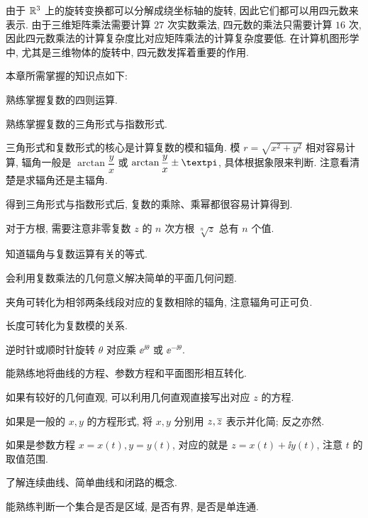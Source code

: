 由于 ${\mathbb{R}}^3$ 上的旋转变换都可以分解成绕坐标轴的旋转, 因此它们都可以用四元数来表示.
由于三维矩阵乘法需要计算 $27$ 次实数乘法, 四元数的乘法只需要计算 $16$ 次, 因此四元数乘法的计算复杂度比对应矩阵乘法的计算复杂度要低.
在计算机图形学中, 尤其是三维物体的旋转中, 四元数发挥着重要的作用.


\startwidepage
{}

本章所需掌握的知识点如下:
\begin{conclusion}
  \item 熟练掌握复数的四则运算.
  \item 熟练掌握复数的三角形式与指数形式.
  \begin{conclusion}
    \item 三角形式和复数形式的核心是计算复数的模和辐角.
    模 $r=\sqrt{x^2+y^2}$ 相对容易计算, 辐角一般是 $\arctan \dfrac yx$ 或 $\arctan \dfrac yx\pm\cpi$, 具体根据象限来判断.
    注意看清楚是求辐角还是主辐角.
    \item 得到三角形式与指数形式后, 复数的乘除、乘幂都很容易计算得到.
    \item 对于方根, 需要注意非零复数 $z$ 的 $n$ 次方根 $\sqrt[n]{z}$ 总有 $n$ 个值.
    \item 知道辐角与复数运算有关的等式.
  \end{conclusion}
  \item 会利用复数乘法的几何意义解决简单的平面几何问题.
  \begin{conclusion}
    \item 夹角可转化为相邻两条线段对应的复数相除的辐角, 注意辐角可正可负.
    \item 长度可转化为复数模的关系.
    \item 逆时针或顺时针旋转 $
    \theta$ 对应乘 $\ee^{\ii\theta}$ 或 $\ee^{-\ii\theta}$.
  \end{conclusion}
  \item 能熟练地将曲线的方程、参数方程和平面图形相互转化.
  \begin{conclusion}
    \item 如果有较好的几何直观, 可以利用几何直观直接写出对应 $z$ 的方程.
    \item 如果是一般的 $x,y$ 的方程形式, 将 $x,y$ 分别用 $z,\overline z$ 表示并化简; 反之亦然.
    \item 如果是参数方程 $x=x(t),y=y(t)$, 对应的就是 $z=x(t)+\ii y(t)$, 注意 $t$ 的取值范围.
  \end{conclusion}
  \item 了解连续曲线、简单曲线和闭路的概念.
  \item 能熟练判断一个集合是否是区域, 是否有界, 是否是单连通.

\end{conclusion}
